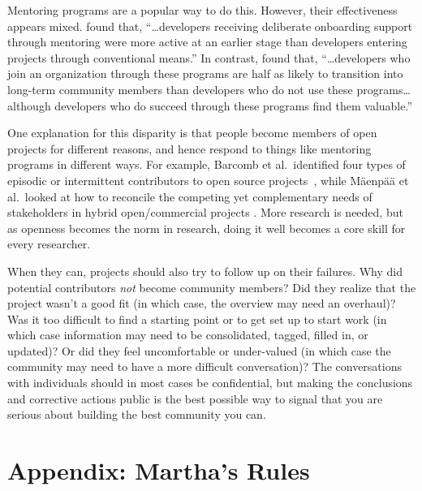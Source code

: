 \documentclass[10pt,letterpaper]{article}
\begin{document}
Mentoring programs are a popular way to do this.
However,
their effectiveness appears mixed.
\cite{fagerholm2014} found that,
``{\ldots}developers receiving deliberate onboarding support through mentoring
were more active at an earlier stage than developers entering projects through conventional means.''
In contrast,
\cite{labuschagne2015} found that,
``{\ldots}developers who join an organization through these programs
are half as likely to transition into long-term community members
than developers who do not use these programs{\ldots}
although developers who do succeed through these programs find them valuable.''

One explanation for this disparity is that people become members of open projects for different reasons,
and hence respond to things like mentoring programs in different ways.
For example,
Barcomb et al.\ identified four types of episodic or intermittent contributors to open source projects~\cite{barcomb2019},
while M\"{a}enp\"{a}\"{a} et al.\ looked at how to reconcile
the competing yet complementary needs of stakeholders in hybrid open/commercial projects \cite{maenpaa2018}.
More research is needed,
but as openness becomes the norm in research,
doing it well becomes a core skill for every researcher.

When they can,
projects should also try to follow up on their failures.
Why did potential contributors \emph{not} become community members?
Did they realize that the project wasn't a good fit
(in which case, the overview may need an overhaul)?
Was it too difficult to find a starting point or to get set up to start work
(in which case information may need to be consolidated, tagged, filled in, or updated)?
Or did they feel uncomfortable or under-valued
(in which case the community may need to have a more difficult conversation)?
The conversations with individuals should in most cases be confidential,
but making the conclusions and corrective actions public
is the best possible way to signal that you are serious about building the best community you can.

\section*{Appendix: Martha's Rules}
\end{document}
